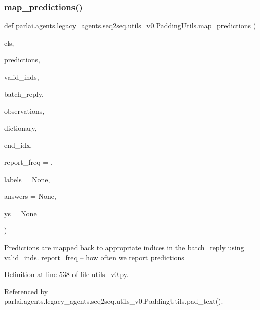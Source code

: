 \subsubsection{\texorpdfstring{map\+\_\+predictions()}{map\_predictions()}}
{\footnotesize\ttfamily def parlai.\+agents.\+legacy\+\_\+agents.\+seq2seq.\+utils\+\_\+v0.\+Padding\+Utils.\+map\+\_\+predictions (\begin{DoxyParamCaption}\item[{}]{cls,  }\item[{}]{predictions,  }\item[{}]{valid\+\_\+inds,  }\item[{}]{batch\+\_\+reply,  }\item[{}]{observations,  }\item[{}]{dictionary,  }\item[{}]{end\+\_\+idx,  }\item[{}]{report\+\_\+freq = {},  }\item[{}]{labels = {\ttfamily None},  }\item[{}]{answers = {\ttfamily None},  }\item[{}]{ys = {\ttfamily None} }\end{DoxyParamCaption})}

\begin{DoxyVerb}Predictions are mapped back to appropriate indices in the batch_reply
   using valid_inds.
   report_freq -- how often we report predictions
\end{DoxyVerb}
 

Definition at line 538 of file utils\+\_\+v0.\+py.



Referenced by parlai.\+agents.\+legacy\+\_\+agents.\+seq2seq.\+utils\+\_\+v0.\+Padding\+Utils.\+pad\+\_\+text().

